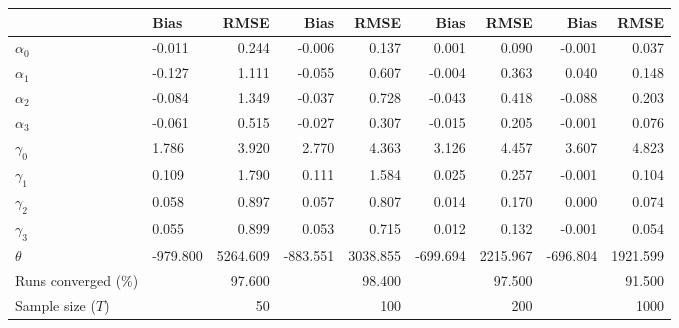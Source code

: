 
\begin{tabular}[t]{llrrrrrrr}
\toprule
  & Bias & RMSE & Bias & RMSE & Bias & RMSE & Bias & RMSE\\
\midrule
$\alpha_{0}$ & -0.011 & 0.244 & -0.006 & 0.137 & 0.001 & 0.090 & -0.001 & 0.037\\
$\alpha_{1}$ & -0.127 & 1.111 & -0.055 & 0.607 & -0.004 & 0.363 & 0.040 & 0.148\\
$\alpha_{2}$ & -0.084 & 1.349 & -0.037 & 0.728 & -0.043 & 0.418 & -0.088 & 0.203\\
$\alpha_{3}$ & -0.061 & 0.515 & -0.027 & 0.307 & -0.015 & 0.205 & -0.001 & 0.076\\
$\gamma_{0}$ & 1.786 & 3.920 & 2.770 & 4.363 & 3.126 & 4.457 & 3.607 & 4.823\\
$\gamma_{1}$ & 0.109 & 1.790 & 0.111 & 1.584 & 0.025 & 0.257 & -0.001 & 0.104\\
$\gamma_{2}$ & 0.058 & 0.897 & 0.057 & 0.807 & 0.014 & 0.170 & 0.000 & 0.074\\
$\gamma_{3}$ & 0.055 & 0.899 & 0.053 & 0.715 & 0.012 & 0.132 & -0.001 & 0.054\\
$\theta$ & -979.800 & 5264.609 & -883.551 & 3038.855 & -699.694 & 2215.967 & -696.804 & 1921.599\\
Runs converged (\%) &  & 97.600 &  & 98.400 &  & 97.500 &  & 91.500\\
Sample size ($T$) &  & 50 &  & 100 &  & 200 &  & 1000\\
\bottomrule
\end{tabular}
